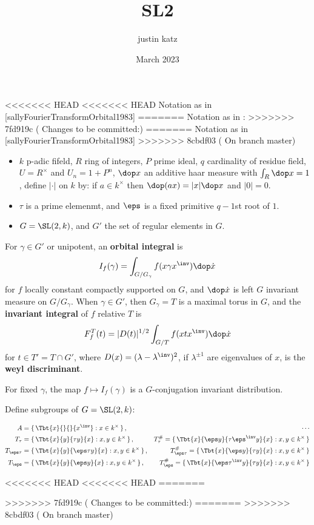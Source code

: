 \documentclass{article}
\title{SL2}
\author{justin katz}
\date{March 2023}
\begin{document}
<<<<<<< HEAD
<<<<<<< HEAD
Notation as in [sallyFourierTransformOrbital1983]
=======
Notation as in \cite{sallyFourierTransformOrbital1983}:
>>>>>>> 7fd919c ( Changes to be committed:)
=======
Notation as in [sallyFourierTransformOrbital1983]
>>>>>>> 8cbdf03 ( On branch master)
\begin{itemize}
    \item $k$ p-adic fifeld, $R$ ring of integers, $P$ prime ideal, $q$ cardinality of residue field, $U = R^\times$ and $U_n = 1 + P^n$, $\dop x$ an additive haar measure with $\int_R \dop x =1$, define $|\cdot|$ on $k$ by: if $a\in k^\times$ then $\dop(ax) = |x| \dop x$ and $|0|=0$. 
    \item $\tau$ is a prime elemenmt, and $\eps$ is a fixed primitive $q-1$st root of $1$. 
    \item $G = \SL(2,k)$, and $G'$ the set of regular elements in $G$. 
\end{itemize}

For $\gamma \in G'$ or unipotent, an \textbf{orbital integral} is
\begin{align*}
    I_f(\gamma) = \int_{G/G_\gamma}f(x \gamma x^\inv)\dop \dot{x} 
\end{align*}
for $f$ locally constant compactly supported on $G$, and $\dop \dot{x}$ is left $G$ invariant measure on $G/G_\gamma$. When $\gamma \in G'$, then $G_\gamma =T$ is a maximal torus in $G$, and the \textbf{invariant integral} of $f$ relative $T$ is 
\begin{align*}
    F_f^T(t) = |D(t)|^{1/2} \int_{G/T} f(xtx^\inv)\dop \dot{x}
\end{align*}
for $t\in T' = T\cap G'$, where $D(x) = (\lambda-\lambda^\inv)^2$, if $\lambda^{\pm 1}$ are eigenvalues of $x$, is the \textbf{weyl discriminant}. 

For fixed $\gamma$, the map $f\mapsto I_f(\gamma)$ is a $G$-conjugation invariant distribution. 

Define subgroups of $G=\SL(2,k)$:

\begin{align*}
    A &= \set{\Tbt{x}{}{}{x^\inv}: x \in k^\times},\quad& \cdots   \\
    T_\tau &= \set{\Tbt{x}{y}{\tau y}{x}: x,y \in k^\times},    &T_\tau^\# = \set{\Tbt{x}{\eps y}{\tau\eps^\inv y}{x}: x,y \in k^\times} \\
    T_{\eps \tau} &= \set{\Tbt{x}{y}{\eps \tau y}{x}: x,y \in k^\times}, &T_{\eps\tau}^\# = \set{\Tbt{x}{\eps y}{\tau y}{x}: x,y \in k^\times}\\ 
    T_{\eps} &= \set{\Tbt{x}{y}{\eps y}{x}: x,y \in k^\times}, &T_{\eps}^\# = \set{\Tbt{x}{\eps \tau^\inv y}{\tau y}{x}: x,y \in k^\times}  
\end{align*}




<<<<<<< HEAD
<<<<<<< HEAD
=======


>>>>>>> 7fd919c ( Changes to be committed:)
=======
>>>>>>> 8cbdf03 ( On branch master)
\end{document}
